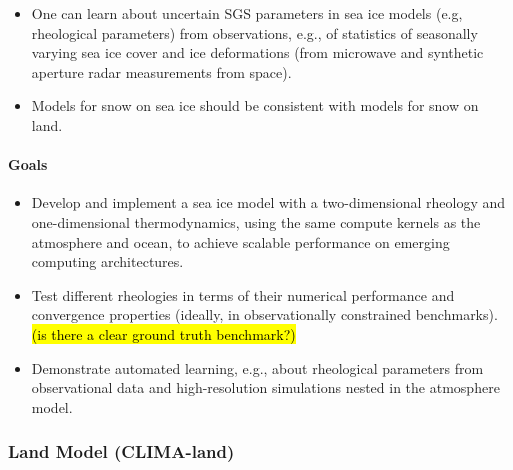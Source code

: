 \documentclass{article}
\begin{document}
\begin{itemize}
\item One can learn about uncertain SGS parameters in sea ice models (e.g, rheological parameters) from observations, e.g., of statistics of seasonally varying sea ice cover and ice deformations (from microwave and synthetic aperture radar measurements from space).
\item Models for snow on sea ice should be consistent with models for snow on land.
\end{itemize}

\paragraph{Goals}
\begin{itemize}
    \item Develop and implement a sea ice model with a two-dimensional rheology and one-dimensional thermodynamics, using the same compute kernels as the atmosphere and ocean, to achieve scalable performance on emerging computing architectures. 
    \item Test different rheologies in terms of their numerical performance and convergence properties (ideally, in observationally constrained benchmarks). \hl{(is there a clear ground truth benchmark?)}
    \item Demonstrate automated learning, e.g., about rheological parameters from observational data and high-resolution simulations nested in the atmosphere model.
 \end{itemize}

\subsubsection{Land Model (CLIMA-land)}
\end{document}
